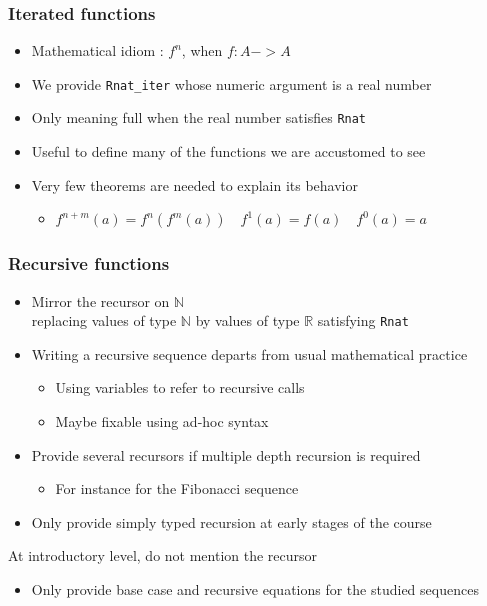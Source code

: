 \documentclass[compress]{beamer}
\begin{document}
\begin{frame}[fragile]
\frametitle{Iterated functions}
\begin{itemize}
\item Mathematical idiom : \(f ^ n\), when \(f : A -> A\)
\item We provide {\tt Rnat\_iter} whose numeric argument is a real number
\item Only meaning full when the real number satisfies {\tt Rnat}
\item Useful to define many of the functions we are accustomed to see
\item Very few theorems are needed to explain its behavior
\begin{itemize}
\item \(f^{n+m}(a) = f^{n}(f^{m}(a))\quad f^1(a) = f(a)\quad f^0(a) = a\)
\end{itemize}
\end{itemize}
\end{frame}
\begin{frame}
\frametitle{Recursive functions}
\begin{itemize}
\item Mirror the recursor on \(\mathbb N\)\\ replacing values of
type \(\mathbb N\) by values of type \(\mathbb R\) satisfying {\tt Rnat}
\item Writing a recursive sequence departs from usual mathematical practice
\begin{itemize}
\item Using variables to refer to recursive calls
\item Maybe fixable using ad-hoc syntax
\end{itemize}
\item Provide several recursors if multiple depth recursion is required
\begin{itemize}
\item For instance for the Fibonacci sequence
\end{itemize}
\item Only provide simply typed recursion at early stages of the course
\end{itemize}
\item At introductory level, do not mention the recursor
\begin{itemize}
\item Only provide base case and recursive equations for the studied sequences
\end{itemize}
\end{frame}
\end{document}
